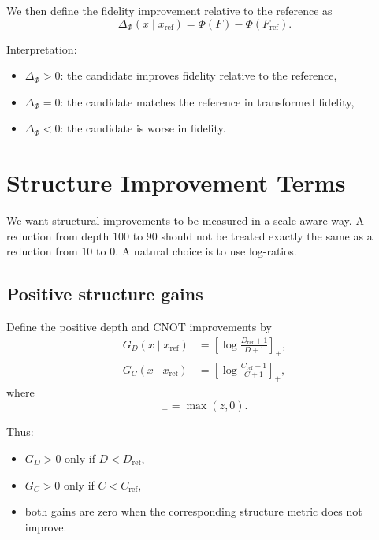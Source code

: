 \documentclass[11pt]{article}
\begin{document}
We then define the fidelity improvement relative to the reference as
\begin{equation}
    \Delta_{\Phi}(x\mid x_{\mathrm{ref}})
    = \Phi(F) - \Phi(F_{\mathrm{ref}}).
\end{equation}

Interpretation:
\begin{itemize}
    \item $\Delta_{\Phi} > 0$: the candidate improves fidelity relative to the reference,
    \item $\Delta_{\Phi} = 0$: the candidate matches the reference in transformed fidelity,
    \item $\Delta_{\Phi} < 0$: the candidate is worse in fidelity.
\end{itemize}

\section{Structure Improvement Terms}

We want structural improvements to be measured in a scale-aware way. A reduction from depth $100$ to $90$ should not be treated exactly the same as a reduction from $10$ to $0$.
A natural choice is to use log-ratios.

\subsection{Positive structure gains}

Define the positive depth and CNOT improvements by
\begin{align}
    G_D(x\mid x_{\mathrm{ref}})
    &= \left[\log\frac{D_{\mathrm{ref}}+1}{D+1}\right]_+, \\
    G_C(x\mid x_{\mathrm{ref}})
    &= \left[\log\frac{C_{\mathrm{ref}}+1}{C+1}\right]_+,
\end{align}
where
\begin{equation}
    [z]_+ = \max(z,0).
\end{equation}

Thus:
\begin{itemize}
    \item $G_D > 0$ only if $D < D_{\mathrm{ref}}$,
    \item $G_C > 0$ only if $C < C_{\mathrm{ref}}$,
    \item both gains are zero when the corresponding structure metric does not improve.
\end{itemize}
\end{document}
